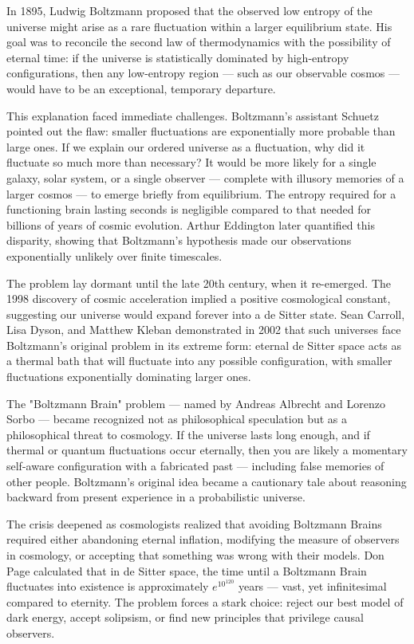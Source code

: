 \begin{historical}
In 1895, Ludwig Boltzmann proposed that the observed low entropy of the universe might arise as a rare fluctuation within a larger equilibrium state. His goal was to reconcile the second law of thermodynamics with the possibility of eternal time: if the universe is statistically dominated by high-entropy configurations, then any low-entropy region — such as our observable cosmos — would have to be an exceptional, temporary departure.

This explanation faced immediate challenges. Boltzmann's assistant Schuetz pointed out the flaw: smaller fluctuations are exponentially more probable than large ones. If we explain our ordered universe as a fluctuation, why did it fluctuate so much more than necessary? It would be more likely for a single galaxy, solar system, or a single observer — complete with illusory memories of a larger cosmos — to emerge briefly from equilibrium. The entropy required for a functioning brain lasting seconds is negligible compared to that needed for billions of years of cosmic evolution. Arthur Eddington later quantified this disparity, showing that Boltzmann's hypothesis made our observations exponentially unlikely over finite timescales.

The problem lay dormant until the late 20th century, when it re-emerged. The 1998 discovery of cosmic acceleration implied a positive cosmological constant, suggesting our universe would expand forever into a de Sitter state. Sean Carroll, Lisa Dyson, and Matthew Kleban demonstrated in 2002 that such universes face Boltzmann's original problem in its extreme form: eternal de Sitter space acts as a thermal bath that will fluctuate into any possible configuration, with smaller fluctuations exponentially dominating larger ones.

The "Boltzmann Brain" problem — named by Andreas Albrecht and Lorenzo Sorbo — became recognized not as philosophical speculation but as a philosophical threat to cosmology. If the universe lasts long enough, and if thermal or quantum fluctuations occur eternally, then you are likely a momentary self-aware configuration with a fabricated past — including false memories of other people. Boltzmann's original idea became a cautionary tale about reasoning backward from present experience in a probabilistic universe.

The crisis deepened as cosmologists realized that avoiding Boltzmann Brains required either abandoning eternal inflation, modifying the measure of observers in cosmology, or accepting that something was wrong with their models. Don Page calculated that in de Sitter space, the time until a Boltzmann Brain fluctuates into existence is approximately $e^{10^{120}}$ years — vast, yet infinitesimal compared to eternity. The problem forces a stark choice: reject our best model of dark energy, accept solipsism, or find new principles that privilege causal observers.


\end{historical}
